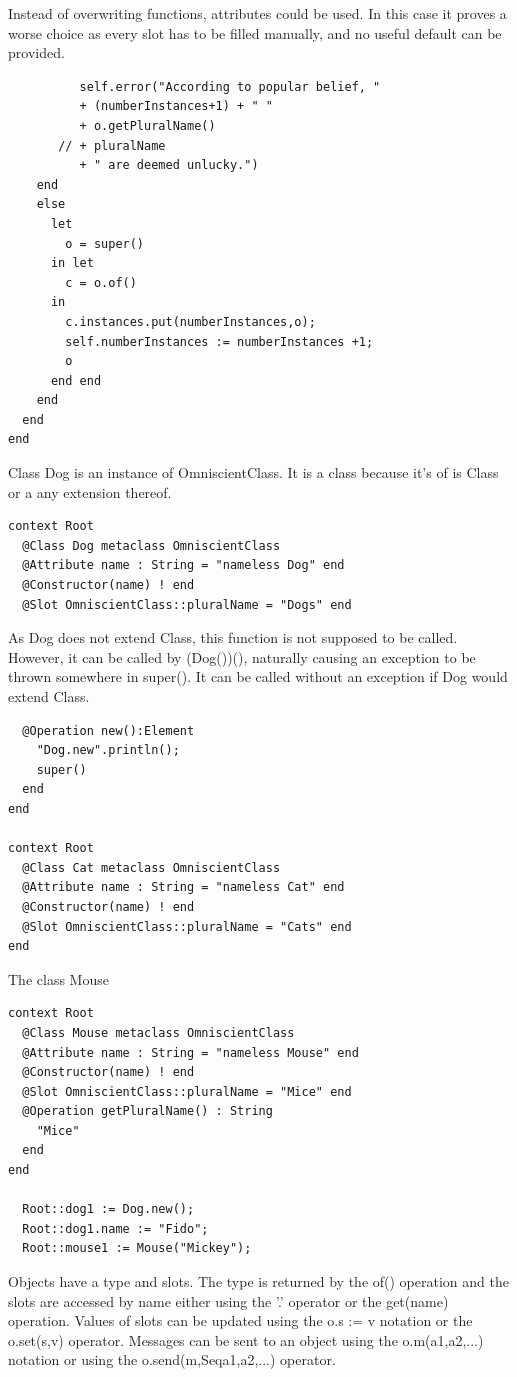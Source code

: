 \documentclass{scrreprt}
\begin{document}
Instead of overwriting functions, attributes could be used. In this case it
proves a worse choice as every slot has to be filled manually, and no useful
default can be provided.
\begin{verbatim}
          self.error("According to popular belief, " 
          + (numberInstances+1) + " " 
          + o.getPluralName() 
       // + pluralName 
          + " are deemed unlucky.")
    end
    else 
      let 
        o = super()
      in let
        c = o.of()
      in
        c.instances.put(numberInstances,o);
        self.numberInstances := numberInstances +1;
        o
      end end
    end
  end
end
\end{verbatim}
Class {\ttfamily Dog} is an instance of {\ttfamily OmniscientClass}. It is a
class because it's {\ttfamily of} is {\ttfamily Class} or a any extension
thereof.
\begin{verbatim}
context Root
  @Class Dog metaclass OmniscientClass
  @Attribute name : String = "nameless Dog" end
  @Constructor(name) ! end
  @Slot OmniscientClass::pluralName = "Dogs" end
\end{verbatim}
As {\ttfamily Dog} does not extend {\ttfamily Class}, this function is not
supposed to be called. However, it can be called by {\ttfamily(Dog())()},
naturally causing an exception to be thrown somewhere in {\ttfamily super()}.
It can be called without an exception if {\ttfamily Dog} would extend {\ttfamily Class}.
\begin{verbatim}
  @Operation new():Element
    "Dog.new".println();
    super()
  end
end

context Root
  @Class Cat metaclass OmniscientClass
  @Attribute name : String = "nameless Cat" end
  @Constructor(name) ! end
  @Slot OmniscientClass::pluralName = "Cats" end
end
\end{verbatim}
The class {\ttfamily Mouse} 
\begin{verbatim}
context Root
  @Class Mouse metaclass OmniscientClass
  @Attribute name : String = "nameless Mouse" end
  @Constructor(name) ! end
  @Slot OmniscientClass::pluralName = "Mice" end
  @Operation getPluralName() : String  
    "Mice"
  end
end

  Root::dog1 := Dog.new();
  Root::dog1.name := "Fido";
  Root::mouse1 := Mouse("Mickey");
\end{verbatim}



 Objects have a type and slots. The type is returned by the of() operation and the slots are accessed by name either using the '.' operator or the get(name) operation. Values of slots can be updated using the o.s := v notation or the o.set(s,v) operator. Messages can be sent to an object using the o.m(a1,a2,...) notation or using the o.send(m,Seq{a1,a2,...}) operator.
\vspace{3mm}
\end{document}
